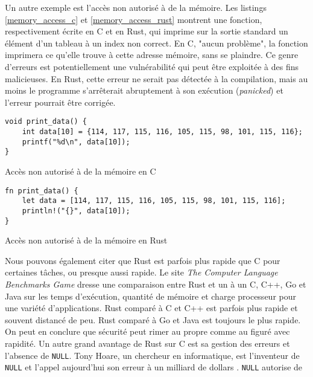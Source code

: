 \bigbreak
Un autre exemple est l'accès non autorisé à de la mémoire. Les listings \ref{memory_access_c} 
et \ref{memory_access_rust} montrent une fonction, respectivement écrite en C et en Rust, qui 
imprime sur la sortie standard un élément d'un tableau à un index non correct. En C, "aucun problème", 
la fonction imprimera ce qu'elle trouve à cette adresse mémoire, sans se plaindre. Ce genre 
d'erreurs est potentiellement une vulnérabilité qui peut être exploitée à des fins malicieuses.
En Rust, cette erreur ne serait pas détectée à la compilation, mais au moins le programme 
s'arrêterait abruptement à son exécution (\textit{panicked}) et l'erreur pourrait être corrigée.
\bigbreak
\begin{code}
    \begin{verbatim}
void print_data() {
    int data[10] = {114, 117, 115, 116, 105, 115, 98, 101, 115, 116};
    printf("%d\n", data[10]);
}
    \end{verbatim}
    \caption{Accès non autorisé à de la mémoire en C}
    \label{memory_access_c}
\end{code}
\bigbreak
\bigbreak
\begin{code}
    \begin{verbatim}
fn print_data() {
    let data = [114, 117, 115, 116, 105, 115, 98, 101, 115, 116];
    println!("{}", data[10]);
}
    \end{verbatim}
    \caption{Accès non autorisé à de la mémoire en Rust}
    \label{memory_access_rust}
\end{code}
\bigbreak
Nous pouvons également citer que Rust est parfois plus rapide que C pour certaines tâches, ou 
presque aussi rapide. Le site \textit{The Computer Language Benchmarks Game} \cite{ref51} dresse 
une comparaison entre Rust et un à un C, C++, Go et Java sur les temps d'exécution, quantité de 
mémoire et charge processeur pour une variété d'applications. Rust comparé à C et C++ est parfois 
plus rapide et souvent distancé de peu. Rust comparé à Go et Java est toujours le plus rapide. 
On peut en conclure que sécurité peut rimer au propre comme au figuré avec rapidité.
\bigbreak
Un autre grand avantage de Rust sur C est sa gestion des erreurs et l'absence de \texttt{NULL}. 
Tony Hoare, un chercheur en informatique, est l'inventeur de \texttt{NULL} et l'appel 
aujourd'hui son erreur à un milliard de dollars \cite{ref52}. \texttt{NULL} autorise de 
